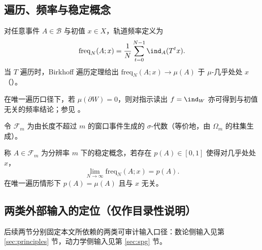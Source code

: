 \subsection{遍历、频率与稳定概念}\label{subsec:prelim-ergodic-frequency}
对任意事件 \(A\in\mathcal{B}\) 与初值 \(x\in X\)，轨道频率定义为
\[
\mathrm{freq}_N(A;x)=\frac1N\sum_{t=0}^{N-1}\ind_A(T^t x).
\]
当 \(T\) 遍历时，Birkhoff 遍历定理给出 \(\mathrm{freq}_N(A;x)\to\mu(A)\) 于 \(\mu\)-几乎处处 \(x\)（\cite{WaltersErgodicTheory}）。

\begin{remark}[唯一遍历下的指示函数]\label{rem:unique-ergodic-indicator}
在唯一遍历口径下，若 \(\mu(\partial W)=0\)，则对指示读出 \(f=\ind_W\) 亦可得到与初值无关的频率结论；参见 \cite{WaltersErgodicTheory}。
\end{remark}

令 \(\mathcal{F}_m\) 为由长度不超过 \(m\) 的窗口事件生成的 \(\sigma\)-代数（等价地，由 \(\Omega_m\) 的柱集生成）。
\begin{definition}[统计稳定概念]\label{def:stable-concept}
称 \(A\in\mathcal{F}_m\) 为分辨率 \(m\) 下的稳定概念，若存在 \(p(A)\in[0,1]\) 使得对几乎处处 \(x\)，
\[
\lim_{N\to\infty}\mathrm{freq}_N(A;x)=p(A).
\]
在唯一遍历情形下 \(p(A)=\mu(A)\) 且与 \(x\) 无关。
\end{definition}

\subsection{两类外部输入的定位（仅作目录性说明）}\label{subsec:prelim-input-map}
后续两节分别固定本文所依赖的两类可审计输入口径：数论侧输入见第 \ref{sec:principles} 节，动力学侧输入见第 \ref{sec:spg} 节。

